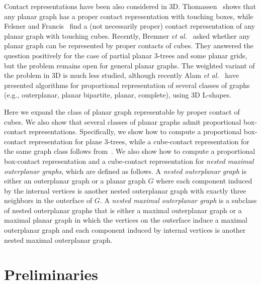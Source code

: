 \documentclass{llncs}
\begin{document}
Contact representations have been also considered in 3D. Thomassen~\cite{Thom88} shows that any planar graph has a proper
 contact representation with touching boxes, while Felsner and Francis~\cite{FF11} find
 a (not necessarily proper) contact representation of any planar graph with touching cubes.
 Recently, Bremner \textit{et al.}~\cite{BEF+12} asked whether any planar graph
 can be represented by proper contacts of cubes. They answered the question positively
 for the case of partial planar 3-trees and some planar grids, but the problem remains
 open for general planar graphs. The weighted variant of the problem
 in 3D is much less studied, although recently Alam \textit{et al.}~\cite{AKLPV14} have
 presented algorithms for proportional representation of several
 classes of graphs (e.g., outerplanar, planar bipartite, planar,
 complete), using 3D L-shapes.







 \smallskip{} Here we expand the class of planar graph representable by proper contact of cubes. We also
 show that several classes of planar graphs admit proportional box-contact representations.
Specifically, we show how to compute a proportional box-contact representation for plane 3-trees, while a cube-contact
 representation for the same graph class follows
 from~\cite{BEF+12}. We also show how to compute a proportional
 box-contact representation and a cube-contact representation for {\em nested maximal outerplanar
   graphs}, which are defined as follows.
A \textit{nested outerplanar graph} is either an outerplanar graph or a planar graph $G$
 where each component induced by the internal vertices is another nested outerplanar
 graph with exactly three neighbors in the outerface of $G$. A \textit{nested maximal
 outerplanar graph} is a subclass of nested outerplanar graphs
that is either a maximal outerplanar graph or a
 maximal planar graph in which the vertices on the outerface induce a maximal outerplanar
 graph and each component induced by internal vertices is another nested maximal outerplanar
 graph. 













\section{Preliminaries}
\end{document}
